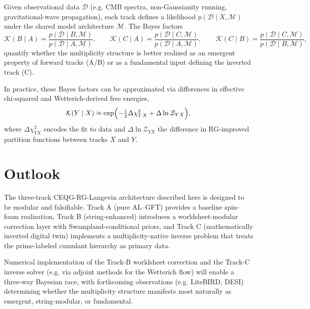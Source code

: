 \documentclass[11pt]{article}
\begin{document}
Given observational data $\mathcal{D}$ (e.g. CMB spectra, non-Gaussianity running, gravitational-wave propagation), each track defines a likelihood $p(\mathcal{D}\mid X,\mathcal{M})$ under the shared model architecture $\mathcal{M}$. The Bayes factors
\begin{equation}
  \mathcal{K}(B\mid A) = \frac{p(\mathcal{D}\mid B,\mathcal{M})}{p(\mathcal{D}\mid A,\mathcal{M})},
  \qquad
  \mathcal{K}(C\mid A) = \frac{p(\mathcal{D}\mid C,\mathcal{M})}{p(\mathcal{D}\mid A,\mathcal{M})},
  \qquad
  \mathcal{K}(C\mid B) = \frac{p(\mathcal{D}\mid C,\mathcal{M})}{p(\mathcal{D}\mid B,\mathcal{M})},
\end{equation}
quantify whether the multiplicity structure is better realized as an emergent property of forward tracks (A/B) or as a fundamental input defining the inverted track (C).

In practice, these Bayes factors can be approximated via differences in effective chi-squared and Wetterich-derived free energies,
\begin{equation}
  \mathcal{K}(Y\mid X)
  \approx
  \exp\Bigl(-\tfrac{1}{2}\Delta\chi^2_{YX} + \Delta\ln\mathcal{Z}_{YX}\Bigr),
\end{equation}
where $\Delta\chi^2_{YX}$ encodes the fit to data and $\Delta\ln\mathcal{Z}_{YX}$ the difference in RG-improved partition functions between tracks $X$ and $Y$.

\section{Outlook}

The three-track CEQG-RG-Langevin architecture described here is designed to be modular and falsifiable. Track A (pure AL--GFT) provides a baseline spin-foam realization, Track B (string-enhanced) introduces a worldsheet-modular correction layer with Swampland-conditional priors, and Track C (mathematically inverted digital twin) implements a multiplicity-native inverse problem that treats the prime-labeled cumulant hierarchy as primary data.

Numerical implementation of the Track-B worldsheet correction and the Track-C inverse solver (e.g. via adjoint methods for the Wetterich flow) will enable a three-way Bayesian race, with forthcoming observations (e.g. LiteBIRD, DESI) determining whether the multiplicity structure manifests most naturally as emergent, string-modular, or fundamental.
\end{document}
